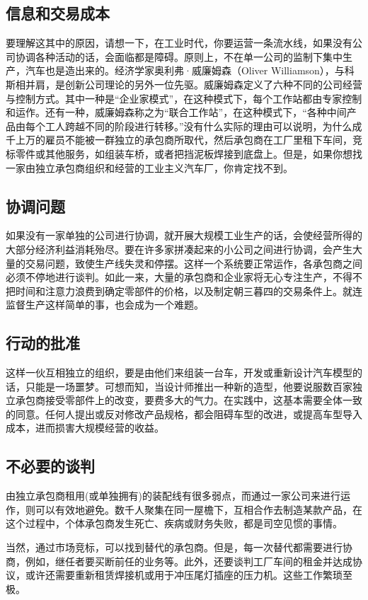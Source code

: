 \subsection{信息和交易成本}
要理解这其中的原因，请想一下，在工业时代，你要运营一条流水线，如果没有公司协调各种活动的话，会面临都是障碍。原则上，不在单一公司的监制下集中生产，汽车也是造出来的。经济学家奥利弗·威廉姆森（Oliver Williamson），与科斯相并肩，是创新公司理论的另外一位先驱。威廉姆森定义了六种不同的公司经营与控制方式。其中一种是“企业家模式”，在这种模式下，每个工作站都由专家控制和运作。还有一种，威廉姆森称之为“联合工作站”，在这种模式下，“各种中间产品由每个工人跨越不同的阶段进行转移。”没有什么实际的理由可以说明，为什么成千上万的雇员不能被一群独立的承包商所取代，然后承包商在工厂里租下车间，竞标零件或其他服务，如组装车桥，或者把挡泥板焊接到底盘上。但是，如果你想找一家由独立承包商组织和经营的工业主义汽车厂，你肯定找不到。

\subsection{协调问题}
如果没有一家单独的公司进行协调，就开展大规模工业生产的话，会使经营所得的大部分经济利益消耗殆尽。要在许多家拼凑起来的小公司之间进行协调，会产生大量的交易问题，致使生产线失灵和停摆。这样一个系统要正常运作，各承包商之间必须不停地进行谈判。如此一来，大量的承包商和企业家将无心专注生产，不得不把时间和注意力浪费到确定零部件的价格，以及制定朝三暮四的交易条件上。就连监督生产这样简单的事，也会成为一个难题。

\subsection{行动的批准}
这样一伙互相独立的组织，要是由他们来组装一台车，开发或重新设计汽车模型的话，只能是一场噩梦。可想而知，当设计师推出一种新的造型，他要说服数百家独立承包商接受零部件上的改变，要费多大的气力。在实践中，这基本需要全体一致的同意。任何人提出或反对修改产品规格，都会阻碍车型的改进，或提高车型导入成本，进而损害大规模经营的收益。

\subsection{不必要的谈判}
由独立承包商租用(或单独拥有)的装配线有很多弱点，而通过一家公司来进行运作，则可以有效地避免。数千人聚集在同一屋檐下，互相合作去制造某款产品，在这个过程中，个体承包商发生死亡、疾病或财务失败，都是司空见惯的事情。

当然，通过市场竞标，可以找到替代的承包商。但是，每一次替代都需要进行协商，例如，继任者要买断前任的业务等。此外，还要谈判工厂车间的租金并达成协议，或许还需要重新租赁焊接机或用于冲压尾灯插座的压力机。这些工作繁琐至极。

